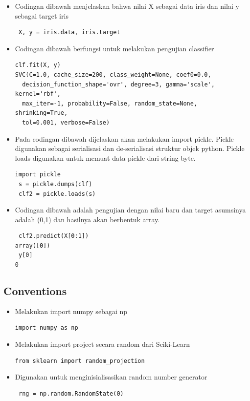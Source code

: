 \begin{enumerate}
\begin{itemize}
\item Codingan dibawah menjelaskan bahwa nilai X sebagai data iris dan nilai y sebagai target iris
\begin{verbatim}
 X, y = iris.data, iris.target
\end{verbatim}

\item Codingan dibawah berfungsi untuk melakukan pengujian classifier
\begin{verbatim}
clf.fit(X, y)  
SVC(C=1.0, cache_size=200, class_weight=None, coef0=0.0,
  decision_function_shape='ovr', degree=3, gamma='scale', kernel='rbf',
  max_iter=-1, probability=False, random_state=None, shrinking=True,
  tol=0.001, verbose=False)
\end{verbatim}

\item Pada codingan dibawah dijelaskan akan melakukan import pickle. Pickle digunakan sebagai serialisasi dan de-serialisasi struktur objek python. Pickle loads digunakan untuk memuat data pickle dari string byte.
\begin{verbatim}
import pickle
 s = pickle.dumps(clf)
 clf2 = pickle.loads(s)
\end{verbatim}

\item Codingan dibawah adalah pengujian dengan nilai baru dan target asumsinya adalah (0,1) dan hasilnya akan berbentuk array.
\begin{verbatim}
 clf2.predict(X[0:1])
array([0])
 y[0]
0
\end{verbatim}
\end{itemize}

\subsection{Conventions}
\begin{itemize}

\item Melakukan import numpy sebagai np
\begin{verbatim}
import numpy as np
\end{verbatim}

\item Melakukan import project secara random dari Sciki-Learn
\begin{verbatim}
from sklearn import random_projection
\end{verbatim}

\item Digunakan untuk menginisialisasikan random number generator
\begin{verbatim}
 rng = np.random.RandomState(0)
\end{verbatim}


\end{itemize}
\end{enumerate}
